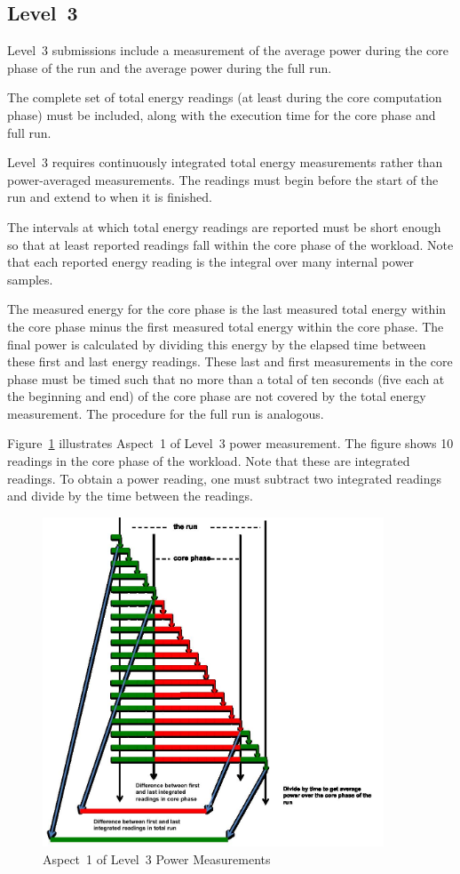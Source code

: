 \subsection{Level~3}

Level~3 submissions include a measurement of the average power during the core phase of the run and the average power during the full run.

The complete set of total energy readings (at least \MinMeasurementsCorePhaseLTwoThree{} during the core computation phase) must be included, along with the execution time for the core phase and full run.

Level~3 requires continuously integrated total energy measurements rather than power-averaged measurements.
The readings must begin before the start of the run and extend to when it is finished.

The intervals at which total energy readings are reported must be short enough so that at least \MinMeasurementsCorePhaseLTwoThree{} reported readings fall within the core phase of the workload.
Note that each reported energy reading is the integral over many internal power samples.

The measured energy for the core phase is the last measured total energy within the core phase minus the first measured total energy within the core phase.
The final power is calculated by dividing this energy by the elapsed time between these first and last energy readings.
These last and first measurements in the core phase must be timed such that no more than a total of ten seconds (five each at the beginning and end) of the core phase are not covered by the total energy measurement.
The procedure for the full run is analogous.

Figure~\ref{fig:a1l3pm} illustrates Aspect~1 of  Level~3 power measurement.
The figure shows \num{10} readings in the core phase of the workload.
Note that these are integrated readings.
To obtain a power reading, one must subtract two integrated readings and divide by the time between the readings.

\begin{figure}[t]
\centering
\includegraphics[width=4in]{fig3-5}
\caption{Aspect~1 of Level~3 Power Measurements}
\label{fig:a1l3pm}
\end{figure}

